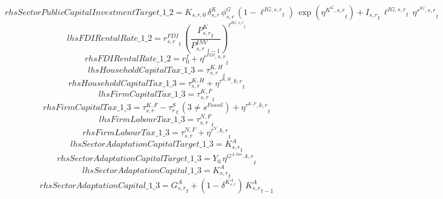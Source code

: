 \begin{dmath*}
rhsSectorPublicCapitalInvestmentTarget\_1\_2 = {{K_{s,r,0}}}\, {{\delta^{K}_{s,r}}}\, {{\phi^{G}_{s,r}}}\, \left(1-{{\ell^{IG,s,r}}}_{t}\right)\, \exp\left({{\eta^{K^G,s,r}}}_{t}\right)+{{I_{s,r}}}_{t}\, {{\ell^{IG,s,r}}}_{t}\, {{\eta^{s^{IG},s,r}}}_{t}
\end{dmath*}
\begin{dmath*}
lhsFDIRentalRate\_1\_2 = {{r^{FDI}_{s,r}}}_{t}\, \left(\frac{{{P^K_{s,r}}}_{t}}{{{P^{INV}_{s,r}}}_{t-1}}\right)^{{{\ell^{IG,s,r}}}_{t}}
\end{dmath*}
\begin{dmath*}
rhsFDIRentalRate\_1\_2 = {{r^f_0}}+{{\eta^{r^{FDI},s,r}}}_{t}
\end{dmath*}
\begin{dmath*}
lhsHouseholdCapitalTax\_1\_3 = {{\tau^{K,H}_{s,r}}}_{t}
\end{dmath*}
\begin{dmath*}
rhsHouseholdCapitalTax\_1\_3 = {{\tau^{K,H}_{s,r}}}+{{\eta^{\tau^{K,H},k,r}}}_{t}
\end{dmath*}
\begin{dmath*}
lhsFirmCapitalTax\_1\_3 = {{\tau^{K,F}_{s,r}}}_{t}
\end{dmath*}
\begin{dmath*}
rhsFirmCapitalTax\_1\_3 = {{\tau^{K,F}_{s,r}}}-{{\tau^{S}_{r}}}_{t}\, \left(3\neq {{s^{Fossil}}}\right)+{{\eta^{\tau^{K,F},k,r}}}_{t}
\end{dmath*}
\begin{dmath*}
lhsFirmLabourTax\_1\_3 = {{\tau^{N,F}_{s,r}}}_{t}
\end{dmath*}
\begin{dmath*}
rhsFirmLabourTax\_1\_3 = {{\tau^{N,F}_{s,r}}}+{{\eta^{\tau^{N},k,r}}}_{t}
\end{dmath*}
\begin{dmath*}
lhsSectorAdaptationCapitalTarget\_1\_3 = {{K^{A}_{s,r}}}_{t}
\end{dmath*}
\begin{dmath*}
rhsSectorAdaptationCapitalTarget\_1\_3 = {{Y_0}}\, {{\eta^{G^{A,tas},k,r}}}_{t}
\end{dmath*}
\begin{dmath*}
lhsSectorAdaptationCapital\_1\_3 = {{K^{A}_{s,r}}}_{t}
\end{dmath*}
\begin{dmath*}
rhsSectorAdaptationCapital\_1\_3 = {{G^{A}_{s,r}}}_{t}+\left(1-{{\delta^{K^{A}_{s,r}}}}\right)\, {{K^{A}_{s,r}}}_{t-1}
\end{dmath*}
